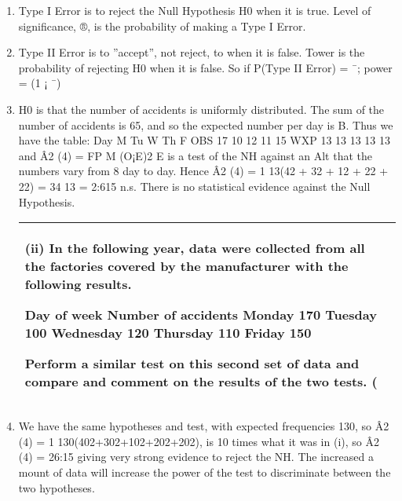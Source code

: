 \documentclass[a4paper,12pt]{article}
\begin{document}
\begin{enumerate}
    \item  Type I Error is to reject the Null Hypothesis H0 when it is true. Level of significance,
®, is the probability of making a Type I Error.
\item Type II Error is to ”accept”, not reject, to when it is false. Tower is the probability
of rejecting H0 when it is false. So if P(Type II Error) = ¯; power = (1 ¡ ¯)
\item  H0 is that the number of accidents is uniformly distributed. The sum of the number
of accidents is 65, and so the expected number per day is B. Thus we have the table:
Day M Tu W Th F
OBS 17 10 12 11 15
WXP 13 13 13 13 13
and Â2
(4) =
FP
M
(O¡E)2
E is a test of the NH against an Alt that the numbers vary from
8
day to day. Hence Â2
(4) = 1
13(42 + 32 + 12 + 22 + 22) = 34
13 = 2:615 n.s. There is no
statistical evidence against the Null Hypothesis.
\begin{table}[ht!]
     \centering
     \begin{tabular}{|p{15cm}|}
     \hline  
 (ii) In the following year, data were collected from all the factories covered by the manufacturer with the following results. 
 
 
Day of week Number of accidents Monday 170 Tuesday 100 Wednesday 120 Thursday 110 Friday 150 
 
 
Perform a similar test on this second set of data and compare and comment on the results of the two tests. (
\\ \hline
      \end{tabular}
    \end{table}
\item  We have the same hypotheses and test, with expected frequencies 130, so Â2
(4) =
1
130(402+302+102+202+202), is 10 times what it was in (i), so Â2
(4) = 26:15 giving
very strong evidence to reject the NH. The increased a mount of data will increase
the power of the test to discriminate between the two hypotheses.
\end{enumerate}
\end{document}
